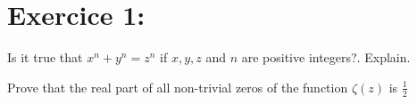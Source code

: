 \documentclass{exam}
\begin{document}
\begin{center}
\end{center}

\vspace{5mm}
\vspace{0.5in}

\section{Exercice 1: }
\begin{questions}

\question [10]
Is it true that \(x^n + y^n = z^n\) if \(x,y,z\) and \(n\) are
positive integers?. Explain.

\vspace{3in}

\question Prove that the real part of all non-trivial zeros of the function
\(\zeta(z)\) is \(\frac{1}{2}\)
\end{questions}
\end{document}
